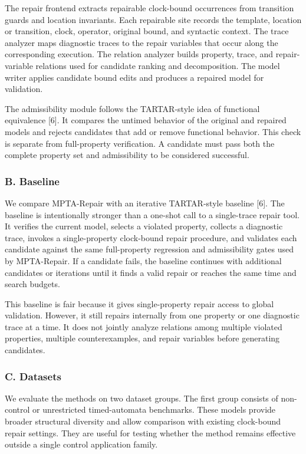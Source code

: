 \documentclass[
]{article}
\begin{document}
The repair frontend extracts repairable clock-bound occurrences from
transition guards and location invariants. Each repairable site records
the template, location or transition, clock, operator, original bound,
and syntactic context. The trace analyzer maps diagnostic traces to the
repair variables that occur along the corresponding execution. The
relation analyzer builds property, trace, and repair-variable relations
used for candidate ranking and decomposition. The model writer applies
candidate bound edits and produces a repaired model for validation.

The admissibility module follows the TARTAR-style idea of functional
equivalence {[}6{]}. It compares the untimed behavior of the original
and repaired models and rejects candidates that add or remove functional
behavior. This check is separate from full-property verification. A
candidate must pass both the complete property set and admissibility to
be considered successful.

\subsubsection{B. Baseline}\label{b.-baseline}

We compare MPTA-Repair with an iterative TARTAR-style baseline {[}6{]}.
The baseline is intentionally stronger than a one-shot call to a
single-trace repair tool. It verifies the current model, selects a
violated property, collects a diagnostic trace, invokes a
single-property clock-bound repair procedure, and validates each
candidate against the same full-property regression and admissibility
gates used by MPTA-Repair. If a candidate fails, the baseline continues
with additional candidates or iterations until it finds a valid repair
or reaches the same time and search budgets.

This baseline is fair because it gives single-property repair access to
global validation. However, it still repairs internally from one
property or one diagnostic trace at a time. It does not jointly analyze
relations among multiple violated properties, multiple counterexamples,
and repair variables before generating candidates.

\subsubsection{C. Datasets}\label{c.-datasets}

We evaluate the methods on two dataset groups. The first group consists
of non-control or unrestricted timed-automata benchmarks. These models
provide broader structural diversity and allow comparison with existing
clock-bound repair settings. They are useful for testing whether the
method remains effective outside a single control application family.
\end{document}
